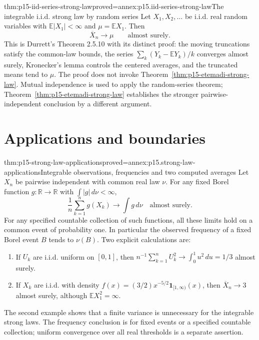 \begin{hbtheorem}{thm:p15-iid-series-strong-law}{proved=annex:p15.iid-series-strong-law}{The integrable i.i.d. strong law by random series}
Let \(X_1,X_2,\ldots\) be i.i.d. real random variables with
\(\mathbb E|X_1|<\infty\) and \(\mu=\mathbb EX_1\). Then
\[
 \overline X_n\longrightarrow\mu\qquad\text{almost surely}.
\]
This is Durrett's Theorem 2.5.10 with its distinct proof: the moving
truncations satisfy the common-law bounds, the series
\(\sum_k(Y_k-\mathbb EY_k)/k\) converges almost surely, Kronecker's
lemma controls the centered averages, and the truncated means tend to
\(\mu\). The proof does not invoke
Theorem~\ref{thm:p15-etemadi-strong-law}. Mutual independence is used
to apply the random-series theorem;
Theorem~\ref{thm:p15-etemadi-strong-law} establishes the stronger
pairwise-independent conclusion by a different argument.
\end{hbtheorem}

\section{Applications and boundaries}
\label{sec:p15-strong-law-applications}

\begin{hbtheorem}{thm:p15-strong-law-applications}{proved=annex:p15.strong-law-applications}{Integrable observations, frequencies and two computed averages}
Let \(X_n\) be pairwise independent with common real law \(\nu\).
For any fixed Borel function \(g:\mathbb R\to\mathbb R\) with
\(\int|g|\,d\nu<\infty\),
\[
 \frac1n\sum_{k=1}^ng(X_k)\longrightarrow\int g\,d\nu
                                           \quad\text{almost surely}.
\]
For any specified countable collection of such functions, all these
limits hold on a common event of probability one. In particular the
observed frequency of a fixed Borel event \(B\) tends to \(\nu(B)\).
Two explicit calculations are:
\begin{enumerate}
\item If \(U_k\) are i.i.d. uniform on \([0,1]\), then
\(n^{-1}\sum_{k=1}^nU_k^2\to\int_0^1u^2\,du=1/3\) almost surely.
\item If \(X_k\) are i.i.d. with density
\(f(x)=(3/2)x^{-5/2}\mathbf1_{[1,\infty)}(x)\), then
\(\overline X_n\to3\) almost surely, although
\(\mathbb EX_1^2=\infty\).
\end{enumerate}
The second example shows that a finite variance is unnecessary for the
integrable strong laws. The frequency conclusion is for fixed events
or a specified countable collection; uniform convergence over all real
thresholds is a separate assertion.
\end{hbtheorem}

